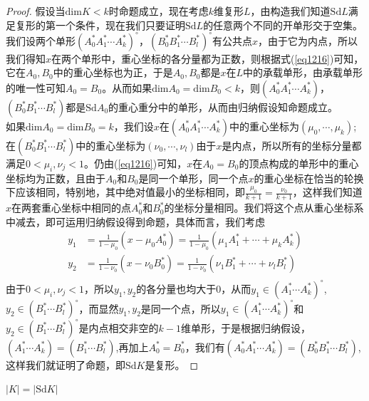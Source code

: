 \begin{proof}
假设当$\text{dim}K<k$时命题成立，现在考虑$k$维复形$L$，由构造我们知道$\text{Sd}L$满足复形的第一个条件，现在我们只要证明$\text{Sd}L$的任意两个不同的开单形交于空集。我们设两个单形$(A^{*}_{0}A^{*}_{1}\cdots A^{*}_{k})^{\circ}$，$(B^{*}_{0}B^{*}_{1}\cdots B^{*}_{l})^{\circ}$有公共点$x$，由于它为内点，所以我们得知$x$在两个单形中，重心坐标的各分量都为正数，则根据式(\ref{eq1216})可知，它在$A_{0},B_{0}$中的重心坐标也为正，于是$A_{0},B_{0}$都是$x$在$L$中的承载单形，由承载单形的唯一性可知$A_{0}=B_{0}$。从而如果$\text{dim}A_{0}=\text{dim}B_{0}<k$，则$(A^{*}_{0}A^{*}_{1}\cdots A^{*}_{k})$，$(B^{*}_{0}B^{*}_{1}\cdots B^{*}_{l})$都是$\text{Sd}A_{0}$的重心重分中的单形，从而由归纳假设知命题成立。\\
如果$\text{dim}A_{0}=\text{dim}B_{0}=k$，我们设$x$在$(A^{*}_{0}A^{*}_{1}\cdots A^{*}_{k})$中的重心坐标为$(\mu_{0},\cdots,\mu_{k})$;在$(B^{*}_{0}B^{*}_{1}\cdots B^{*}_{l})$中的重心坐标为$(\nu_{0},\cdots,\nu_{l})$由于$x$是内点，所以所有的坐标分量都满足$0<\mu_{i},\nu_{j}<1$。仍由(\ref{eq1216})可知，$x$在$A_{0}=B_{0}$的顶点构成的单形中的重心坐标均为正数，且由于$A_{0}$和$B_{0}$是同一个单形，同一个点$x$的重心坐标在恰当的轮换下应该相同，特别地，其中绝对值最小的坐标相同，即$\frac{\mu_{0}}{k+1}=\frac{\nu_{0}}{k+1}$，这样我们知道$x$在两套重心坐标中相同的点$A^{*}_{0}$和$B^{*}_{0}$的坐标分量相同。我们将这个点从重心坐标系中减去，即可运用归纳假设得到命题，具体而言，我们考虑
\begin{equation*}
\begin{aligned}
    y_{1}&=\frac{1}{1-\mu_{0}}(x-\mu_{0}A^{*}_{0})=\frac{1}{1-\mu_{0}}(\mu_{1}A^{*}_{1}+\cdots+\mu_{k}A^{*}_{k})\\
    y_{2}&=\frac{1}{1-\nu_{0}}(x-\nu_{0}B^{*}_{0})=\frac{1}{1-\nu_{0}}(\nu_{1}B^{*}_{1}+\cdots+\nu_{l}B^{*}_{l})\\
\end{aligned}
\end{equation*}
由于$0<\mu_{i},\nu_{j}<1$，所以$y_{1},y_{2}$的各分量也均大于0，从而$y_{1}\in(A^{*}_{1}\cdots A^{*}_{k})^{\circ}$,$y_{2}\in(B^{*}_{1}\cdots B^{*}_{l})^{\circ}$，而显然$y_{1},y_{2}$是同一个点，所以$y_{1}\in(A^{*}_{1}\cdots A^{*}_{k})^{\circ}$和$y_{2}\in(B^{*}_{1}\cdots B^{*}_{l})^{\circ}$是内点相交非空的$k-1$维单形，于是根据归纳假设，$(A^{*}_{1}\cdots A^{*}_{k})=(B^{*}_{1}\cdots B^{*}_{l})$,再加上$A_{0}^{*}=B_{0}^{*}$，我们有$(A^{*}_{0}A^{*}_{1}\cdots A^{*}_{k})=(B^{*}_{0}B^{*}_{1}\cdots B^{*}_{l})$,这样我们就证明了命题，即$\text{Sd}K$是复形。
\end{proof}
\begin{proposition}\label{pro1241}
$|K|=|\text{Sd}K|$
\end{proposition}
